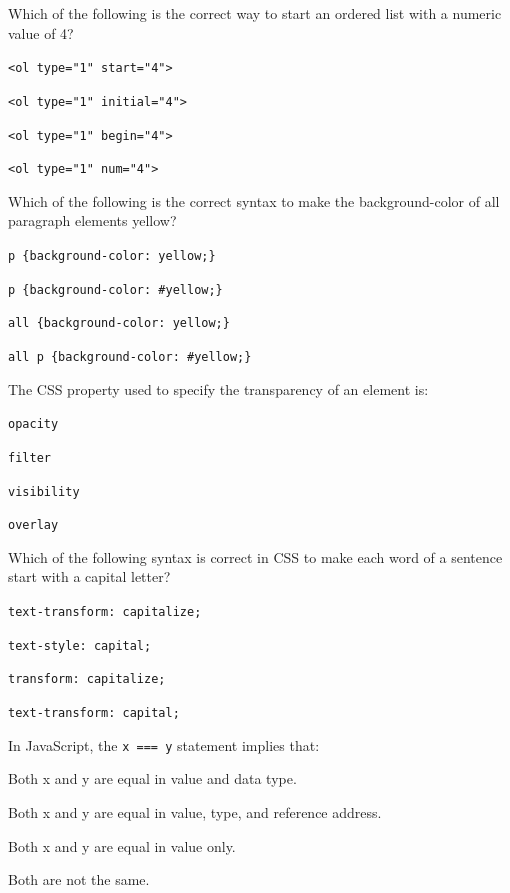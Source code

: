 \documentclass[11pt,a4paper]{article}
\begin{document}
\begin{parts}
  \item Which of the following is the correct way to start an ordered list with a numeric value of 4?
  \begin{parts}
    \item \texttt{<ol type="1" start="4">}
    \item \texttt{<ol type="1" initial="4">}
    \item \texttt{<ol type="1" begin="4">}
    \item \texttt{<ol type="1" num="4">}
  \end{parts}

  \item Which of the following is the correct syntax to make the background-color of all paragraph elements yellow?
  \begin{parts}
    \item \texttt{p \{background-color: yellow;\}}
    \item \texttt{p \{background-color: \#yellow;\}}
    \item \texttt{all \{background-color: yellow;\}}
    \item \texttt{all p \{background-color: \#yellow;\}}
  \end{parts}

  \item The CSS property used to specify the transparency of an element is:
  \begin{parts}
    \item \texttt{opacity}
    \item \texttt{filter}
    \item \texttt{visibility}
    \item \texttt{overlay}
  \end{parts}

  \item Which of the following syntax is correct in CSS to make each word of a sentence start with a capital letter?
  \begin{parts}
    \item \texttt{text-transform: capitalize;}
    \item \texttt{text-style: capital;}
    \item \texttt{transform: capitalize;}
    \item \texttt{text-transform: capital;}
  \end{parts}

  \item In JavaScript, the \texttt{x === y} statement implies that:
  \begin{parts}
    \item Both x and y are equal in value and data type.
    \item Both x and y are equal in value, type, and reference address.
    \item Both x and y are equal in value only.
    \item Both are not the same.
  \end{parts}
\end{parts}
\end{document}
